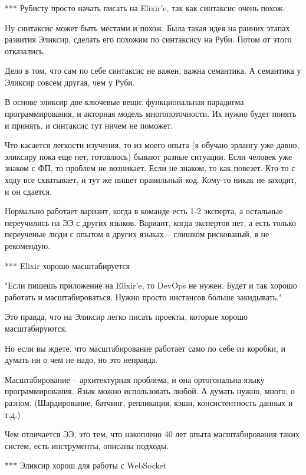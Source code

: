 \documentclass[10pt]{beamer}
\begin{document}
\begin{frame}
\frametitle{}
\centering
\par \bigskip
\end{frame}

*** Рубисту просто начать писать на Elixir'e, так как синтаксис очень похож.

Ну синтаксис может быть местами и похож. Была такая идея на ранних этапах развития Эликсир, сделать его похожим по синтаксису на Руби. Потом от этого отказались.

Дело в том, что сам по себе синтаксис не важен, важна семантика. А семантика у Эликсир совсем другая, чем у Руби.

В основе эликсир две ключевые вещи: функциональная парадигма программирования, и акторная модель многопоточности.
Их нужно будет понять и принять, и синтаксис тут ничем не поможет.

Что касается легкости изучения, то из моего опыта (я обучаю эрлангу уже давно, эликсиру пока еще нет, готовлюсь) бывают разные ситуации.
Если человек уже знаком с ФП, то проблем не возникает.
Если не знаком, то как повезет. Кто-то с ходу все схватывает, и тут же пишет правильный код. Кому-то никак не заходит, и он сдается.

Нормально работает вариант, когда в команде есть 1-2 эксперта, а остальные переучились на ЭЭ с других языков.
Вариант, когда экспертов нет, а есть только переученые люди с опытом в других языках -- слишком рискованый, я не рекомендую.


*** Elixir хорошо масштабируется

"Если пишешь приложение на Elixir'e, то DevOps не нужен. Будет и так хорошо работать и масштабироваться. Нужно просто инстансов больше закидывать."

Это правда, что на Эликсир легко писать проекты, которые хорошо масштабируются.

Но если вы ждете, что масштабирование работает само по себе из коробки, и думать ни о чем не надо, но это неправда.

Масштабирование -- архитектурная проблема, и она ортогональна языку программирования. Язык можно использовать любой. А думать нужно, много, о разном.
(Шардирование, батчинг, репликация, кэши, консистентность данных и т.д.)

Чем отличается ЭЭ, это тем, что накоплено 40 лет опыта масштабирования таких систем, есть инструменты, описаны подходы.


*** Эликсир хорош для работы с WebSocket
\end{document}
